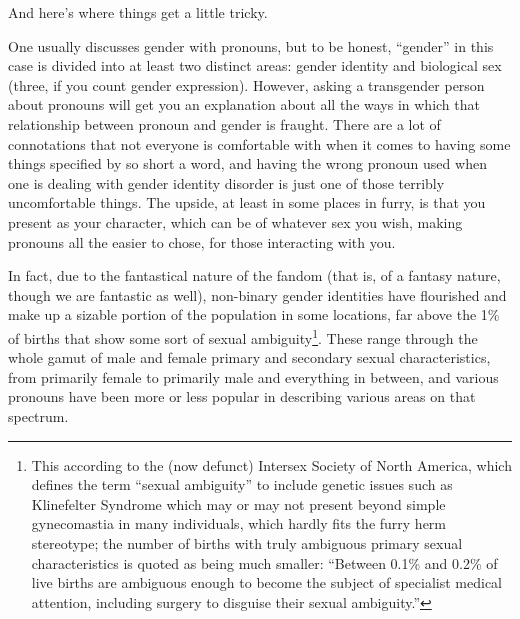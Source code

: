 And here's where things get a little tricky.

One usually discusses gender with pronouns, but to be honest, ``gender'' in this case is divided into at least two distinct areas: gender identity and biological sex (three, if you count gender expression).  However, asking a transgender person about pronouns will get you an explanation about all the ways in which that relationship between pronoun and gender is fraught.  There are a lot of connotations that not everyone is comfortable with when it comes to having some things specified by so short a word, and having the wrong pronoun used when one is dealing with gender identity disorder is just one of those terribly uncomfortable things.  The upside, at least in some places in furry, is that you present as your character, which can be of whatever sex you wish, making pronouns all the easier to chose, for those interacting with you.

In fact, due to the fantastical nature of the fandom (that is, of a fantasy nature, though we are fantastic as well), non-binary gender identities have flourished and make up a sizable portion of the population in some locations, far above the 1\% of births that show some sort of sexual ambiguity\footnote{This according to the (now defunct) Intersex Society of North America, which defines the term ``sexual ambiguity'' to include genetic issues such as Klinefelter Syndrome which may or may not present beyond simple gynecomastia in many individuals, which hardly fits the furry herm stereotype; the number of births with truly ambiguous primary sexual characteristics is quoted as being much smaller: ``Between 0.1\% and 0.2\% of live births are ambiguous enough to become the subject of specialist medical attention, including surgery to disguise their sexual ambiguity.''}.  These range through the whole gamut of male and female primary and secondary sexual characteristics, from primarily female to primarily male and everything in between, and various pronouns have been more or less popular in describing various areas on that spectrum.


